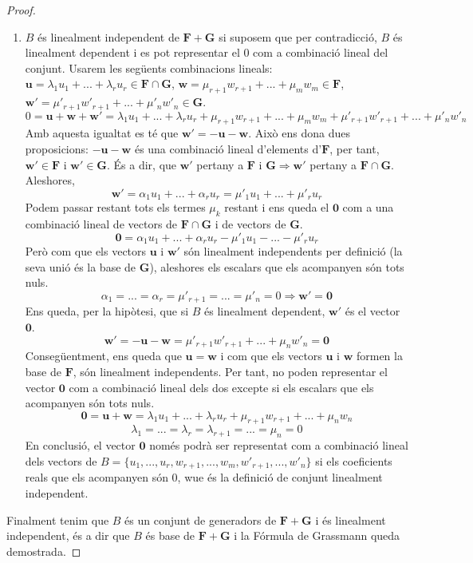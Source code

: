 \begin{proof}
\begin{enumerate}[(1)]
\item $B$ és linealment independent de $\mathbf{F}+\mathbf{G}$ si suposem que per contradicció, $B$ és linealment dependent i es pot representar el $0$ com a combinació lineal del conjunt. Usarem les següents combinacions lineals: $\mathbf{u} = \lambda_1 u_1 + ... + \lambda_r u_r \in \mathbf{F}\cap\mathbf{G}$, $\mathbf{w} = \mu_{r+1} w_{r+1} + ... + \mu_m w_m \in \mathbf{F}$, $\mathbf{w'} = \mu'_{r+1} w'_{r+1} + ... + \mu'_n w'_n \in \mathbf{G}$.
\[
0 = \mathbf{u} + \mathbf{w} + \mathbf{w'} = \lambda_1 u_1 + ... + \lambda_r u_r + \mu_{r+1} w_{r+1} + ... + \mu_m w_m + \mu'_{r+1} w'_{r+1} + ... + \mu'_n w'_n
\]
Amb aquesta igualtat es té que $\mathbf{w'} = -\mathbf{u} -\mathbf{w}$. Això ens dona dues proposicions: $-\mathbf{u} -\mathbf{w}$ és una combinació lineal d'elements d'$\mathbf{F}$, per tant, $\mathbf{w'} \in \mathbf{F}$ i $\mathbf{w'} \in \mathbf{G}$. És a dir, que $\mathbf{w'}$ pertany a $\mathbf{F}$ i $\mathbf{G}\Rightarrow \mathbf{w'}$ pertany a $\mathbf{F}\cap\mathbf{G}$. Aleshores,
\[ \mathbf{w'} = \alpha_1 u_1 + ... + \alpha_r u_r = \mu'_1 u_1 + ... + \mu'_r u_r \]
Podem passar restant tots els termes $\mu_k$ restant i ens queda el $\mathbf{0}$ com a una combinació lineal de vectors de $\mathbf{F}\cap\mathbf{G}$ i de vectors de $\mathbf{G}$.
\[ \mathbf{0} = \alpha_1 u_1 + ... + \alpha_r u_r - \mu'_1 u_1 - ... - \mu'_r u_r \]
Però com que els vectors $\mathbf{u}$ i $\mathbf{w'}$ són linealment independents per definició (la seva unió és la base de $\mathbf{G}$), aleshores els escalars que els acompanyen són tots nuls.
\[ \alpha_1 = ... = \alpha_r = \mu'_{r+1} = ... = \mu'_{n} = 0 \Rightarrow \mathbf{w'} = \mathbf{0}\]
Ens queda, per la hipòtesi, que si $B$ és linealment dependent, $\mathbf{w'}$ és el vector $\mathbf{0}$.
\[
\mathbf{w'} = -\mathbf{u} - \mathbf{w} = \mu'_{r+1} w'_{r+1} + ... + \mu_n w'_n = \mathbf{0}
\]
Consegüentment, ens queda que $\mathbf{u} = \mathbf{w}$ i com que els vectors $\mathbf{u}$ i $\mathbf{w}$ formen la base de $\mathbf{F}$, són linealment independents. Per tant, no poden representar el vector $\mathbf{0}$ com a combinació lineal dels dos excepte si els escalars que els acompanyen són tots nuls.
\[\mathbf{0} = \mathbf{u} + \mathbf{w} = \lambda_1 u_1 + ... + \lambda_r u_r + \mu_{r+1} w_{r+1} + ... + \mu_n w_n\]
\[ \lambda_1 = ... = \lambda_r = \lambda_{r+1} = ... = \mu_n = 0 \]
En conclusió, el vector $\mathbf{0}$ només podrà ser representat com a combinació lineal dels vectors de $B = \{u_1,...,u_r, w_{r+1}, ..., w_m, w'_{r+1},...,w'_n\}$ si els coeficients reals que els acompanyen són $0$, wue és la definició de conjunt linealment independent.
\end{enumerate}

Finalment tenim que $B$ és un conjunt de generadors de $\mathbf{F}+\mathbf{G}$ i és linealment independent, és a dir que $B$ és base de $\mathbf{F}+\mathbf{G}$ i la Fórmula de Grassmann queda demostrada. 
\end{proof}

